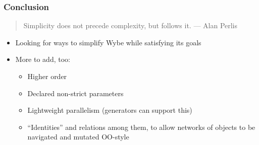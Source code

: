 \documentclass[12pt]{beamer}
\begin{document}
\begin{frame}[fragile]
\frametitle{Conclusion}
\begin{quotation}
\noindent
Simplicity does not precede complexity, but follows it.
\hspace*{3em}--- Alan Perlis
\end{quotation}
\vspace{3ex}
\begin{itemize}
\item Looking for ways to simplify Wybe while satisfying its goals
\item More to add, too:
  \begin{itemize}
  \item Higher order
  \item Declared non-strict parameters
  \item Lightweight parallelism (generators can support this)
  \item ``Identities'' and relations among them, to allow
    networks of objects to be navigated and mutated OO-style
  \end{itemize}

\end{itemize}
\end{frame}


\end{document}
